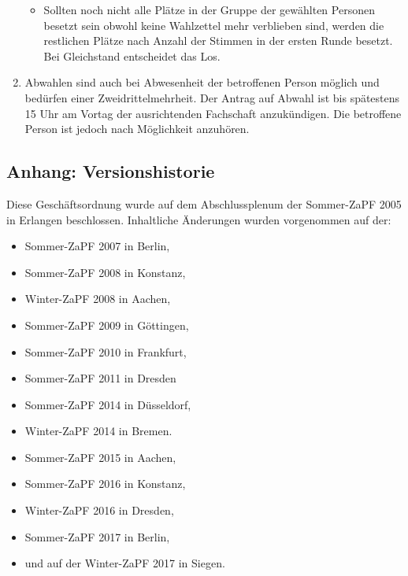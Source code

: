 \begin{enumerate}
\begin{itemize}
\item Sollten noch nicht alle Plätze in der Gruppe der gewählten Personen
besetzt sein obwohl keine Wahlzettel mehr verblieben sind, werden
die restlichen Plätze nach Anzahl der Stimmen in der ersten Runde
besetzt. Bei Gleichstand entscheidet das Los.
\end{itemize}

\item Abwahlen sind auch bei Abwesenheit der betroffenen Person möglich und
bedürfen einer Zweidrittelmehrheit. Der Antrag auf Abwahl ist bis spätestens
15 Uhr am Vortag der ausrichtenden Fachschaft anzukündigen.
Die betroffene Person ist jedoch nach Möglichkeit anzuhören.
\end{enumerate}


\subsection*{Anhang: Versionshistorie%
  \label{anhang-versionshistorie}%
}

Diese Geschäftsordnung wurde auf dem Abschlussplenum der Sommer-ZaPF 2005 in
Erlangen beschlossen.
Inhaltliche Änderungen wurden vorgenommen auf der:

\begin{itemize}
\item Sommer-ZaPF 2007 in Berlin,

\item Sommer-ZaPF 2008 in Konstanz,

\item Winter-ZaPF 2008 in Aachen,

\item Sommer-ZaPF 2009 in Göttingen,

\item Sommer-ZaPF 2010 in Frankfurt,

\item Sommer-ZaPF 2011 in Dresden

\item Sommer-ZaPF 2014 in Düsseldorf,

\item Winter-ZaPF 2014 in Bremen.

\item Sommer-ZaPF 2015 in Aachen,

\item Sommer-ZaPF 2016 in Konstanz,

\item Winter-ZaPF 2016 in Dresden,

\item Sommer-ZaPF 2017 in Berlin,

\item und auf der Winter-ZaPF 2017 in Siegen.
\end{itemize}


